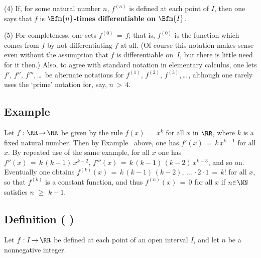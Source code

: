 \V

        (4) If, for some natural number $n$, $f^{(n)}$ is defined at each point of $I$,
    then one says that $f$ is {\bf $\Bfm{n}$-times differentiable on $\Bfm{I}$}.

\V

        (5) For completeness, one sets $f^{(0)} \,=\, f$; that is, $f^{(0)}$ is the function which comes from $f$ by not differentiating $f$ at all.
    (Of course this notation makes sense even without the assumption that $f$ is differentiable on~$I$, but there is little need for it then.)
    Also, to agree with standard notation in elementary calculus, one lets $f'$, $f''$, $f'''$,\,{\ldots}\, be alternate notations for $f^{(1)}$, $f^{(2)}$, $f^{(3)}$,\,{\ldots}\,,
    although one rarely uses the `prime' notation for, say, $n\,>\,4$.

\V

            \subsection{\small{\bf Example}}
            \label{ExampE20.90}
\V

\hspace*{\parindent}Let $f:{\RR} \,{\rightarrow}\, {\RR}$ be given by the rule $f(x) \,=\, x^{k}$ for all $x$ in ${\RR}$,
    where $k$ is a fixed natural number. Then by Example~ above, one  has $f'(x) \,=\, k\,x^{k-1}$ for all $x$.
    By repeated use of the same example, for all $x$ one has $f''(x) \,=\, k\,(k-1)\,x^{k-2}$, $f'''(x) \,=\, k\,(k-1)\,(k-2)\,x^{k-3}$, and so on.
    Eventually one obtains $f^{(k)}(x) \,=\, k\,(k-1)\,(k-2), \,{\ldots}\, {\cdot}2{\cdot}1 \,=\, k!$ for all $x$,
    so that $f^{(k)}$ is a constant function, and thus $f^{(n)}(x) \,=\, 0$ for all $x$ if $n{\in}{\NN}$ satisfies $n\,\,{\geq}\,\,k+1$.

\VV

            \subsection{\small{\bf Definition} ( )}
            \label{DefE20.95}

\V

        Let $f:I \,{\rightarrow}\, {\RR}$ be defined at each point of an open interval $I$, and let $n$ be a nonnegative integer.

\V


